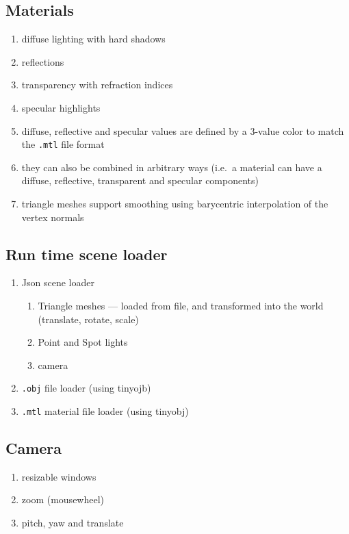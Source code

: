 \subsection{Materials}
    \begin{enumerate}
    \item diffuse lighting with hard shadows
    \item reflections
    \item transparency with refraction indices
    \item specular highlights
    \item diffuse, reflective and specular values are defined by a 3-value color to match the \verb|.mtl| file format
    \item they can also be combined in arbitrary ways (i.e.\ a material can have a diffuse, reflective, transparent and specular components)
    \item triangle meshes support smoothing using barycentric interpolation of the vertex normals
    \end{enumerate}

\subsection{Run time scene loader}
    \begin{enumerate}
    \item Json scene loader
        \begin{enumerate}
        \item Triangle meshes --- loaded from file, and transformed into the world (translate, rotate, scale)
        \item Point and Spot lights
        \item camera
        \end{enumerate}
    \item \verb|.obj| file loader (using tinyojb)
    \item \verb|.mtl| material file loader (using tinyobj)
    \end{enumerate}

\subsection{Camera}
    \begin{enumerate}
    \item resizable windows
    \item zoom (mousewheel)
    \item pitch, yaw and translate
    \end{enumerate}

